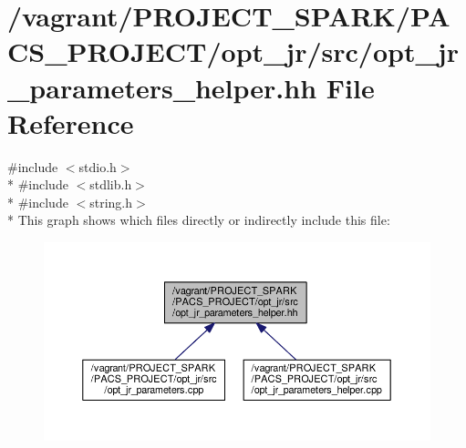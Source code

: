 \hypertarget{opt__jr__parameters__helper_8hh}{\section{/vagrant/\-P\-R\-O\-J\-E\-C\-T\-\_\-\-S\-P\-A\-R\-K/\-P\-A\-C\-S\-\_\-\-P\-R\-O\-J\-E\-C\-T/opt\-\_\-jr/src/opt\-\_\-jr\-\_\-parameters\-\_\-helper.hh File Reference}
\label{opt__jr__parameters__helper_8hh}
}
{\ttfamily \#include $<$stdio.\-h$>$}\\*
{\ttfamily \#include $<$stdlib.\-h$>$}\\*
{\ttfamily \#include $<$string.\-h$>$}\\*
This graph shows which files directly or indirectly include this file\-:
\nopagebreak
\begin{figure}[H]
\begin{center}
\leavevmode
\includegraphics[width=350pt]{opt__jr__parameters__helper_8hh__dep__incl}
\end{center}
\end{figure}
